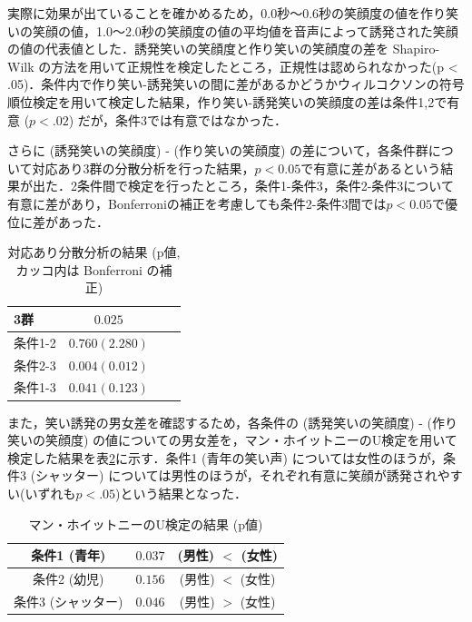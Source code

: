 \documentclass[submit,techreq]{ec2014}
\begin{document}
実際に効果が出ていることを確かめるため，0.0秒〜0.6秒の笑顔度の値を作り笑いの笑顔の値，1.0〜2.0秒の笑顔度の値の平均値を音声によって誘発された笑顔の値の代表値とした．誘発笑いの笑顔度と作り笑いの笑顔度の差を Shapiro-Wilk の方法を用いて正規性を検定したところ，正規性は認められなかった(p < .05)．条件内で作り笑い-誘発笑いの間に差があるかどうかウィルコクソンの符号順位検定を用いて検定した結果，作り笑い-誘発笑いの笑顔度の差は条件1,2で有意 ($p<.02$) だが，条件3では有意ではなかった．

さらに (誘発笑いの笑顔度) - (作り笑いの笑顔度) の差について，各条件群について対応あり3群の分散分析を行った結果，$p<0.05$で有意に差があるという結果が出た．2条件間で検定を行ったところ，条件1-条件3，条件2-条件3について有意に差があり，Bonferroniの補正を考慮しても条件2-条件3間では$p<0.05$で優位に差があった．

\begin{table}[htb]
  \begin{center}
    \caption{対応あり分散分析の結果 (p値, カッコ内は Bonferroni の補正)}
    \begin{tabular}{|l|c|r||r|} \hline
      3群 & $0.025$  \\ \hline 
      条件1-2 & $0.760 (2.280)$ \\ \hline
      条件2-3 & $0.004 (0.012)$ \\ \hline
      条件1-3 & $0.041 (0.123)$ \\ \hline
    \end{tabular}
    \label{tab:price}
  \end{center}
\end{table}

また，笑い誘発の男女差を確認するため，各条件の (誘発笑いの笑顔度) - (作り笑いの笑顔度) の値についての男女差を，マン・ホイットニーのU検定を用いて検定した結果を表\ref{manw}に示す．条件1 (青年の笑い声) については女性のほうが，条件3 (シャッター) については男性のほうが，それぞれ有意に笑顔が誘発されやすい(いずれも$p < .05$)という結果となった．

\begin{table}[htb]
  \begin{center}
    \caption{マン・ホイットニーのU検定の結果 (p値)}
    \begin{tabular}{|c|c|c|}  \hline
      条件1 (青年) & $0.037$ & (男性) $<$ (女性) \\ \hline
      条件2 (幼児)  & $0.156$ & (男性) $<$ (女性) \\ \hline
      条件3 (シャッター) & $0.046$ & (男性) $>$ (女性) \\ \hline
    \end{tabular}
    \label{manw}
  \end{center}
\end{table}
\end{document}
